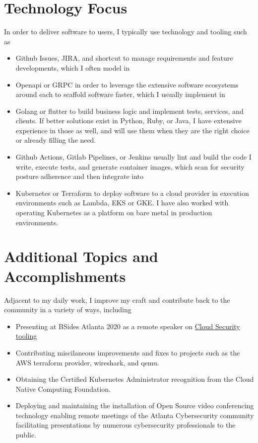 \documentclass[letterpaper,11pt]{article}
\begin{document}
\section{Technology Focus}
In order to deliver software to users, I typically use technology and tooling such as
\begin{itemize}
\item Github Issues, JIRA, and shortcut to manage requirements and feature developments, which I often model in
\item Openapi or GRPC in order to leverage the extensive software ecosystems around each to scaffold software faster, which I usually implement in
\item Golang or flutter to build business logic and implement tests, services, and clients. If better solutions exist in Python, Ruby, or Java, I have extensive experience in those as well, and will use them when they are the right choice or already filling the need.
\item Github Actions, Gitlab Pipelines, or Jenkins usually lint and build the code I write, execute tests, and generate container images, which scan for security posture adherence and then integrate into
\item Kubernetes or Terraform to deploy software to a cloud provider in execution environments such as Lambda, EKS or GKE. I have also worked with operating Kubernetes as a platform on bare metal in production environments.
\end{itemize}

\section{Additional Topics and Accomplishments}
Adjacent to my daily work, I improve my craft and contribute back to the community in a variety of ways, including
\begin{itemize}
	\item Presenting at BSides Atlanta 2020 as a remote speaker on \href{https://www.youtube.com/watch?v=kLCaAaUd1mM}{\color{blue}Cloud Security tooling}
	\item Contributing miscilaneous improvements and fixes to projects such as the AWS terraform provider, wireshark, and qemu.
	\item Obtaining the Certified Kubernetes Administrator recognition from the Cloud Native Computing Foundation.
  \item Deploying and maintaining the installation of Open Source video conferencing technology enabling remote meetings of the Atlanta Cybersecurity community facilitating presentations by numerous cybersecurity professionals to the public.
\end{itemize}
\end{document}
